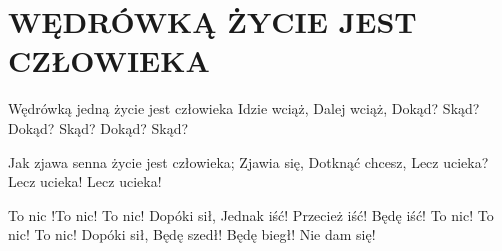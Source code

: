 \documentclass[../../../songbook.tex]{subfiles}
\begin{document}
\TabPositions{8cm} %
\section*{WĘDRÓWKĄ ŻYCIE JEST CZŁOWIEKA}
{}
\vspace{0.5cm}
Wędrówką jedną życie jest człowieka 	 \newline
Idzie wciąż, 				 \newline
Dalej wciąż, 				 \newline
Dokąd? Skąd? 				 \newline
Dokąd? Skąd? 				 \newline
Dokąd? Skąd? 				 \newline

Jak zjawa senna życie jest człowieka; \newline
Zjawia się,  \newline
Dotknąć chcesz, \newline
Lecz ucieka? \newline
Lecz ucieka! \newline
Lecz ucieka! \newline

\-\hspace{1cm} To nic !To nic! To nic!		 \newline
\-\hspace{1cm} Dopóki sił, 					 \newline
\-\hspace{1cm} Jednak iść! Przecież iść! 	 \newline
\-\hspace{1cm} Będę iść! 					 \newline
\-\hspace{1cm} To nic! To nic! To nic! 		 \newline
\-\hspace{1cm} Dopóki sił, 					 \newline
\-\hspace{1cm} Będę szedł! Będę biegł! 		 \newline
\-\hspace{1cm} Nie dam się! 				 \newline
\end{document}
